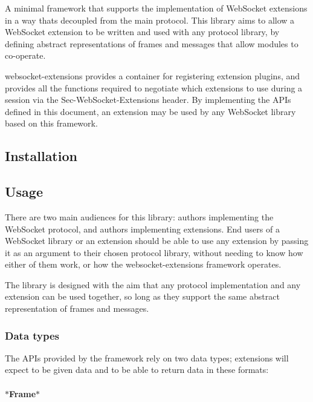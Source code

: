 A minimal framework that supports the implementation of Web\+Socket extensions in a way that\textquotesingle{}s decoupled from the main protocol. This library aims to allow a Web\+Socket extension to be written and used with any protocol library, by defining abstract representations of frames and messages that allow modules to co-\/operate.

{\ttfamily websocket-\/extensions} provides a container for registering extension plugins, and provides all the functions required to negotiate which extensions to use during a session via the {\ttfamily Sec-\/\+Web\+Socket-\/\+Extensions} header. By implementing the A\+P\+Is defined in this document, an extension may be used by any Web\+Socket library based on this framework.

\subsection*{Installation}




\subsection*{Usage}

There are two main audiences for this library\+: authors implementing the Web\+Socket protocol, and authors implementing extensions. End users of a Web\+Socket library or an extension should be able to use any extension by passing it as an argument to their chosen protocol library, without needing to know how either of them work, or how the {\ttfamily websocket-\/extensions} framework operates.

The library is designed with the aim that any protocol implementation and any extension can be used together, so long as they support the same abstract representation of frames and messages.

\subsubsection*{Data types}

The A\+P\+Is provided by the framework rely on two data types; extensions will expect to be given data and to be able to return data in these formats\+:

\paragraph*{$\ast$\+Frame$\ast$}

